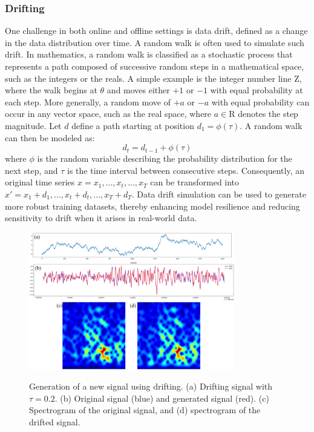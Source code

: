 \documentclass[journal]{IEEEtran}
\begin{document}
\subsubsection{Drifting}
One challenge in both online and offline settings is data drift, defined as a change in the data distribution over time. A random walk is often used to simulate such drift. In mathematics, a random walk is classified as a stochastic process that represents a path composed of successive random steps in a mathematical space, such as the integers or the reals. A simple example is the integer number line $\mathrm{Z}$, where the walk begins at $\theta$ and moves either $+1$ or $-1$ with equal probability at each step. More generally, a random move of $+a$ or $-a$ with equal probability can occur in any vector space, such as the real space, where $a \in \mathrm{R}$ denotes the step magnitude\cite{fields2019mitigating}.
Let $d$ define a path starting at position $d_1=\phi(\tau)$. A random walk can then be modeled as:
$$d_t=d_{t-1}+\phi(\tau)$$
where $\phi$ is the random variable describing the probability distribution for the next step, and $\tau$ is the time interval between consecutive steps. Consequently, an original time series $x={x_1,...,x_t,...,x_T}$ can be transformed into $x'={x_1+d_1,...,x_t+d_t,...,x_T+d_T}$.
Data drift simulation can be used to generate more robust training datasets, thereby enhancing model resilience and reducing sensitivity to drift when it arises in real-world data.
\begin{figure}
\centering
{\includegraphics[width=0.8\textwidth,keepaspectratio]{img/da_drifting.png}}
\caption{Generation of a new signal using drifting. (a) Drifting signal with $\tau=0.2$. (b) Original signal (blue) and generated signal (red). (c) Spectrogram of the original signal, and (d) spectrogram of the drifted signal.}
\label{fig:da_drifting}
\end{figure}
\end{document}
